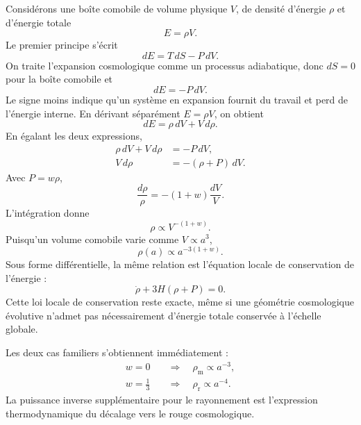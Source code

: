 Considérons une boîte comobile de volume physique \(V\), de densité d’énergie \(\rho\) et d’énergie totale
\begin{equation}
E=\rho V.
\end{equation}
Le premier principe s’écrit
\begin{equation}
dE=T\,dS-P\,dV.
\end{equation}
On traite l’expansion cosmologique comme un processus adiabatique, donc \(dS=0\) pour la boîte comobile et
\begin{equation}
dE=-P\,dV.
\label{eq:c04-adiabatic-first-law}
\end{equation}
Le signe moins indique qu’un système en expansion fournit du travail et perd de l’énergie interne. En dérivant séparément \(E=\rho V\), on obtient
\begin{equation}
dE=\rho\,dV+V\,d\rho.
\end{equation}
En égalant les deux expressions,
\begin{align}
\rho\,dV+V\,d\rho&=-P\,dV,\\
V\,d\rho&=-(\rho+P)\,dV.
\label{eq:c04-volume-continuity}
\end{align}
Avec \(P=w\rho\),
\begin{equation}
\frac{d\rho}{\rho}=-(1+w)\frac{dV}{V}.
\end{equation}
L’intégration donne
\begin{equation}
\rho\propto V^{-(1+w)}.
\end{equation}
Puisqu’un volume comobile varie comme \(V\propto a^3\),
\begin{equation}
\boxed{\rho(a)\propto a^{-3(1+w)}}.
\label{eq:c04-density-scaling}
\end{equation}
Sous forme différentielle, la même relation est l’équation locale de conservation de l’énergie :
\begin{equation}
\dot\rho+3H(\rho+P)=0.
\label{eq:c04-continuity}
\end{equation}
Cette loi locale de conservation reste exacte, même si une géométrie cosmologique évolutive n’admet pas nécessairement d’énergie totale conservée à l’échelle globale.

Les deux cas familiers s’obtiennent immédiatement :
\begin{align}
w=0
&\quad\Longrightarrow\quad
\rho_{\mathrm m}\propto a^{-3},\\
w=\frac13
&\quad\Longrightarrow\quad
\rho_{\mathrm r}\propto a^{-4}.
\end{align}
La puissance inverse supplémentaire pour le rayonnement est l’expression thermodynamique du décalage vers le rouge cosmologique.

